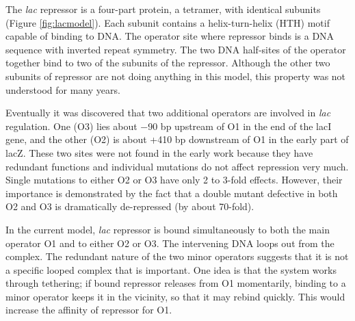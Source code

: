 The \emph{lac} repressor is a four-part protein, a tetramer, with identical subunits (Figure \ref{fig:lacmodel}). Each subunit contains a helix-turn-helix (HTH) motif capable of binding to DNA. The operator site where repressor binds is a DNA sequence with inverted repeat symmetry. The two DNA half-sites of the operator together bind to two of the subunits of the repressor. Although the other two subunits of repressor are not doing anything in this model, this property was not understood for many years.

Eventually it was discovered that two additional operators are involved in \emph{lac} regulation. One (O3) lies about −90 bp upstream of O1 in the end of the lacI gene, and the other (O2) is about +410 bp downstream of O1 in the early part of lacZ. These two sites were not found in the early work because they have redundant functions and individual mutations do not affect repression very much. Single mutations to either O2 or O3 have only 2 to 3-fold effects. However, their importance is demonstrated by the fact that a double mutant defective in both O2 and O3 is dramatically de-repressed (by about 70-fold).

In the current model, \emph{lac} repressor is bound simultaneously to both the main operator O1 and to either O2 or O3. The intervening DNA loops out from the complex. The redundant nature of the two minor operators suggests that it is not a specific looped complex that is important. One idea is that the system works through tethering; if bound repressor releases from O1 momentarily, binding to a minor operator keeps it in the vicinity, so that it may rebind quickly. This would increase the affinity of repressor for O1.



